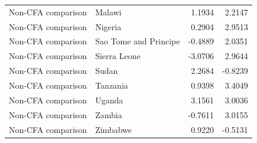 \begin{table}
\begin{tabular}[t]{llrr}
Non-CFA comparison & Malawi & 1.1934 & 2.2147\\
Non-CFA comparison & Nigeria & 0.2904 & 2.9513\\
Non-CFA comparison & Sao Tome and Principe & -0.4889 & 2.0351\\
Non-CFA comparison & Sierra Leone & -3.0706 & 2.9644\\
\addlinespace
Non-CFA comparison & Sudan & 2.2684 & -0.8239\\
Non-CFA comparison & Tanzania & 0.9398 & 3.4049\\
Non-CFA comparison & Uganda & 3.1561 & 3.0036\\
Non-CFA comparison & Zambia & -0.7611 & 3.0155\\
Non-CFA comparison & Zimbabwe & 0.9220 & -0.5131\\
\bottomrule
\end{tabular}
\end{table}